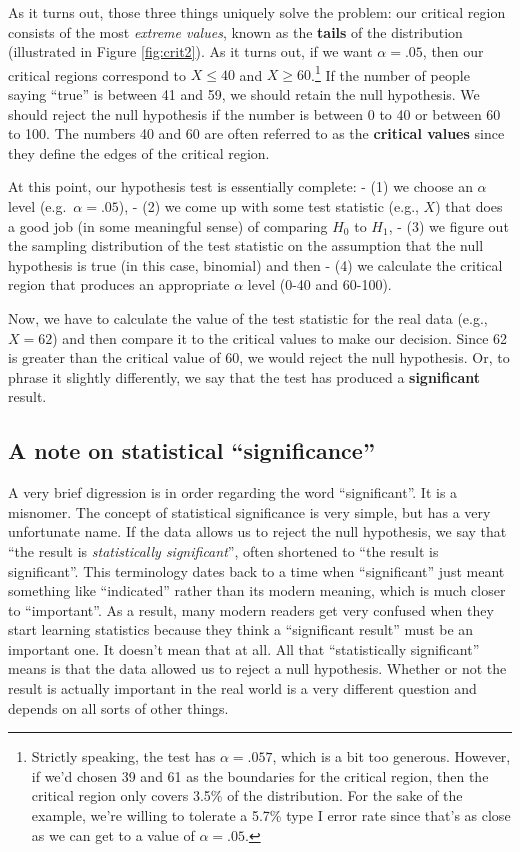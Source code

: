 \documentclass[
  11pt,
  a4paper,
  twoside,symmetric,openright]{book}
\theoremstyle{break}
\theoremstyle{break}
\begin{document}
As it turns out, those three things uniquely solve the problem: our critical region consists of the most \emph{extreme values}, known as the \textbf{tails} of the distribution (illustrated in Figure \ref{fig:crit2}). As it turns out, if we want \(\alpha = .05\), then our critical regions correspond to \(X \leq 40\) and \(X \geq 60\).\footnote{Strictly speaking, the test has \(\alpha = .057\), which is a bit too generous. However, if we'd chosen 39 and 61 as the boundaries for the critical region, then the critical region only covers 3.5\% of the distribution. For the sake of the example, we're willing to tolerate a 5.7\% type I error rate since that's as close as we can get to a value of \(\alpha = .05\).} If the number of people saying ``true'' is between 41 and 59, we should retain the null hypothesis. We should reject the null hypothesis if the number is between 0 to 40 or between 60 to 100. The numbers 40 and 60 are often referred to as the \textbf{critical values} since they define the edges of the critical region.

At this point, our hypothesis test is essentially complete:
- (1) we choose an \(\alpha\) level (e.g.~\(\alpha = .05\)),
- (2) we come up with some test statistic (e.g., \(X\)) that does a good job (in some meaningful sense) of comparing \(H_0\) to \(H_1\),
- (3) we figure out the sampling distribution of the test statistic on the assumption that the null hypothesis is true (in this case, binomial) and then
- (4) we calculate the critical region that produces an appropriate \(\alpha\) level (0-40 and 60-100).

Now, we have to calculate the value of the test statistic for the real data (e.g., \(X = 62\)) and then compare it to the critical values to make our decision. Since 62 is greater than the critical value of 60, we would reject the null hypothesis. Or, to phrase it slightly differently, we say that the test has produced a \textbf{significant} result.

\subsection{A note on statistical ``significance''}\label{a-note-on-statistical-significance}

A very brief digression is in order regarding the word ``significant''. It is a misnomer. The concept of statistical significance is very simple, but has a very unfortunate name. If the data allows us to reject the null hypothesis, we say that ``the result is \emph{statistically significant}'', often shortened to ``the result is significant''. This terminology dates back to a time when ``significant'' just meant something like ``indicated'' rather than its modern meaning, which is much closer to ``important''. As a result, many modern readers get very confused when they start learning statistics because they think a ``significant result'' must be an important one. It doesn't mean that at all. All that ``statistically significant'' means is that the data allowed us to reject a null hypothesis. Whether or not the result is actually important in the real world is a very different question and depends on all sorts of other things.
\end{document}
